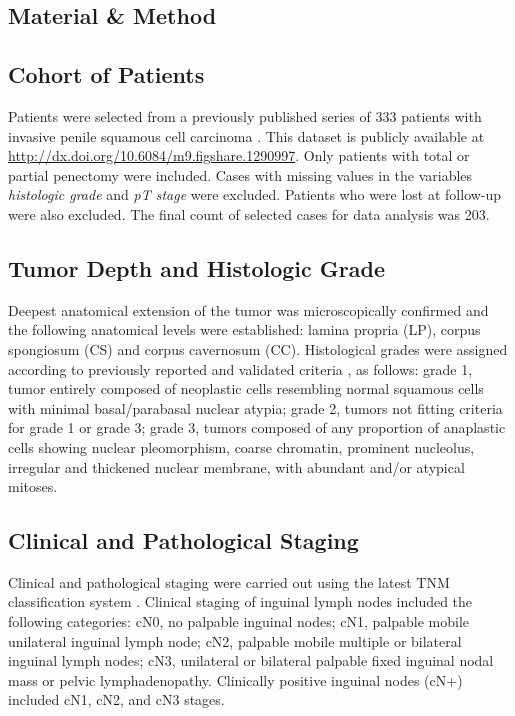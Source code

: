 \documentclass[11pt,letterpaper]{article}\usepackage[]{graphicx}\usepackage[]{color}
\begin{document}
\begin{multicols}{2}
\section*{Material \& Method}
\subsection*{Cohort of Patients}
Patients were selected from a previously published series of 333 patients with invasive penile squamous cell carcinoma \cite{Guimaraes2009}. This dataset is publicly available at \href{http://dx.doi.org/10.6084/m9.figshare.1290997}{http://dx.doi.org/10.6084/m9.figshare.1290997}. Only patients with total or partial penectomy were included. Cases with missing values in the variables \emph{histologic grade} and \emph{pT stage} were excluded. Patients who were lost at follow-up were also excluded. The final count of selected cases for data analysis was 203.

\subsection*{Tumor Depth and Histologic Grade}
Deepest anatomical extension of the tumor was microscopically confirmed and the following anatomical levels were established: lamina propria (LP), corpus spongiosum (CS) and corpus cavernosum (CC). Histological grades were assigned according to previously reported and validated criteria \cite{Velazquez2008,Chaux2009b}, as follows: grade 1, tumor entirely composed of neoplastic cells resembling normal squamous cells with minimal basal/parabasal nuclear atypia; grade 2, tumors not fitting criteria for grade 1 or grade 3; grade 3, tumors composed of any proportion of anaplastic cells showing nuclear pleomorphism, coarse chromatin, prominent nucleolus, irregular and thickened nuclear membrane, with abundant and/or atypical mitoses.

\subsection*{Clinical and Pathological Staging}
Clinical and pathological staging were carried out using the latest TNM classification system \cite{Hakenberg2015}. Clinical staging of inguinal lymph nodes included the following categories: cN0, no palpable inguinal nodes; cN1, palpable mobile unilateral inguinal lymph node; cN2, palpable mobile multiple or bilateral inguinal lymph nodes; cN3, unilateral or bilateral palpable fixed inguinal nodal mass or pelvic lymphadenopathy. Clinically positive inguinal nodes (cN+) included cN1, cN2, and cN3 stages.


\end{multicols}
\end{document}
